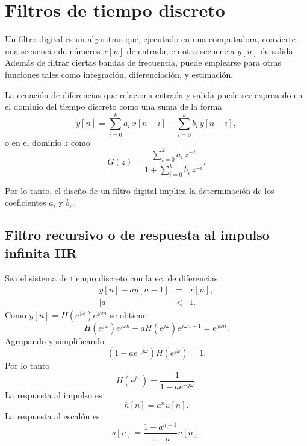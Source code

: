 \section{Filtros de tiempo discreto}

Un filtro digital es un algoritmo que, ejecutado en una computadora,
convierte una secuencia de n\'{u}meros $x[n]$ de entrada, en otra
secuencia $y[n]$ de salida. Adem\'{a}s de filtrar
ciertas bandas de frecuencia, puede emplearse para otras funciones
tales como integraci\'{o}n, diferenciaci\'{o}n, y estimaci\'{o}n.

La ecuaci\'{o}n de diferencias que relaciona entrada y salida puede
ser expresado en el dominio del tiempo discreto como una suma de la
forma
\begin{equation}
y[n] = \sum_{i = 0}^{k} a_{i} \, x [n - i] - \sum_{i=0}^{k} b_{i} \, y[n-i],
\end{equation}
o en el dominio $z$ como
\begin{equation}
G(z) = \frac{\sum_{i = 0}^{k} a_{i} \, z^{-i}}{1 + \sum_{i=0}^{k} b_{i} \, z^{-i}}.
\end{equation}

Por lo tanto, el dise\~{n}o de un filtro digital implica la
determinaci\'{o}n de los coeficientes $a_{i}$ y $b_{i}$.

\subsection{Filtro recursivo o de respuesta al impulso infinita \textbf{IIR}}

Sea el sistema de tiempo discreto con la ec. de diferencias 
\begin{eqnarray}
        y\left[ n\right] -ay\left[ n-1\right]   &=&     x\left[ n\right] , \\
        \left| a\right|                         &<&     1.
\end{eqnarray}
Como $y\left[ n\right] =H\left( e^{j\omega }\right) e^{j\omega n}$ se obtiene 
\begin{equation}
        H\left( e^{j\omega }\right) e^{j\omega n}-aH\left( e^{j\omega }\right) e^{j\omega n-1} = 
                e^{j\omega n}.
\end{equation}
Agrupando y simplificando 
\begin{equation}
        \left( 1-ae^{-j\omega }\right) H\left( e^{j\omega }\right) =1.
\end{equation}
Por lo tanto 
\begin{equation}
        H\left( e^{j\omega }\right) =\frac{1}{1-ae^{-j\omega }}.
\end{equation}
La respuesta al impulso es 
\begin{equation}
        h[n]=a^nu\left[ n\right] .
\end{equation}
La respuesta al escal\'{o}n es 
\begin{equation}
        s\left[ n\right] =\frac{1-a^{n+1}}{1-a}u\left[ n\right] .
\end{equation}

